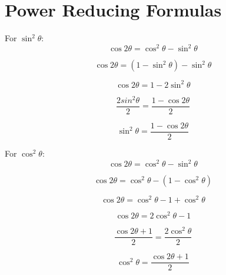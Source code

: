 \section{Power Reducing Formulas}
\begin{minipage}{0.7\textwidth}
\begin{framed}
  For $\sin^2\theta$:
  \begin{equation*}
    \cos 2\theta = \cos^2\theta - \sin^2\theta
  \end{equation*}

  \begin{equation*}
    \cos 2\theta = (1 - \sin^2\theta) - \sin^2 \theta
  \end{equation*}

  \begin{equation*}
    \cos 2\theta = 1 - 2 \sin^2\theta
  \end{equation*}

  \begin{equation*}
    \frac{2sin^2\theta}{2} = \frac{1-\cos 2\theta}{2}
  \end{equation*}

  \begin{equation*}
    \sin^2\theta = \frac{1-\cos 2\theta}{2}
  \end{equation*}

  For $\cos^2\theta$:
  \begin{equation*}
    \cos 2\theta = \cos^2\theta - \sin^2\theta
  \end{equation*}

  \begin{equation*}
    \cos 2\theta = \cos^2\theta - (1 - \cos^2\theta)
  \end{equation*}

  \begin{equation*}
    \cos 2\theta = \cos^2\theta - 1 + \cos^2\theta
  \end{equation*}

  \begin{equation*}
    \cos 2\theta = 2\cos^2\theta - 1 
  \end{equation*}

  \begin{equation*}
    \frac{\cos 2\theta+1}{2} = \frac{2\cos^2\theta}{2}
  \end{equation*}

  \begin{equation*}
    \cos^2\theta = \frac{\cos 2\theta + 1}{2}
  \end{equation*}


\end{framed}
\end{minipage}
